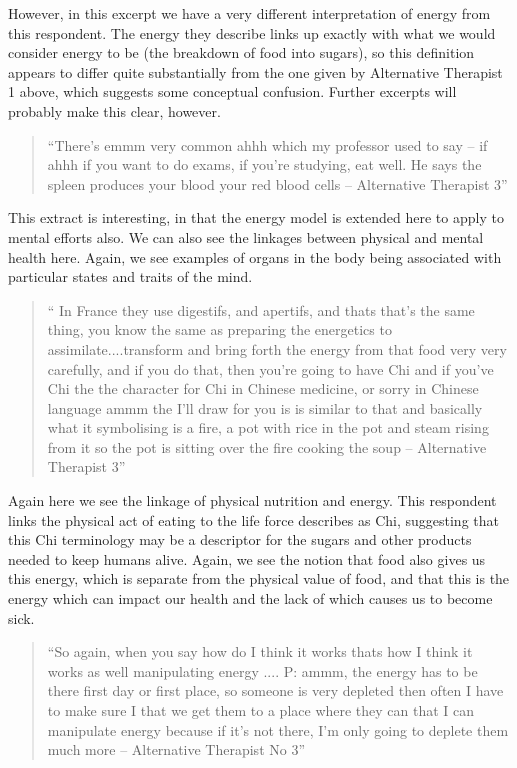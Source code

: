 However, in this excerpt we have a very different interpretation of energy from this respondent. The energy they describe links up exactly with what we would consider energy to be (the breakdown of food into sugars), so this definition appears to differ quite substantially from the one given by Alternative Therapist 1 above, which suggests some conceptual confusion. Further excerpts will probably make this clear, however. 

\begin{quotation}
``There's emmm very common ahhh which my professor used to say – if ahhh if you want to do exams, if you're studying, eat well. He says the spleen produces your blood your red blood cells – Alternative Therapist 3''  
\end{quotation}


This extract is interesting, in that the energy model is extended here to apply to mental efforts also. We can also see the linkages between physical and mental health here. Again, we see examples of organs in the body being associated with particular states and traits of the mind. 

\begin{quotation}
`` In France they use digestifs, and apertifs, and thats that's the same thing, you know the same as preparing the energetics to assimilate....transform and bring forth the energy from that food very very carefully, and if you do that, then you're going to have Chi and if you've Chi the the character for Chi in Chinese medicine, or sorry in Chinese language ammm the I'll draw for you is is similar to that and basically what it symbolising is a fire, a pot with rice in the pot and steam rising from it so the pot is sitting over the fire cooking the soup – Alternative Therapist 3''  
\end{quotation}


Again here we see the linkage of physical nutrition and energy. This respondent links the physical act of eating to the life force describes as Chi, suggesting that this Chi terminology may be a descriptor for the sugars and other products needed to keep humans alive. Again, we see the notion that food also gives us this energy, which is separate from the physical value of food, and that this is the energy which can impact our health and the lack of which causes us to become sick. 


\begin{quotation}
``So again, when you say how do I think it works thats how I think it works as well manipulating energy
....
P: ammm, the energy has to be there first day or first place, so someone is very depleted then often I have to make sure I that we get them to a place where they can that I can manipulate energy because if it's not there, I'm only going to deplete them much more – Alternative Therapist No 3''  
\end{quotation}


